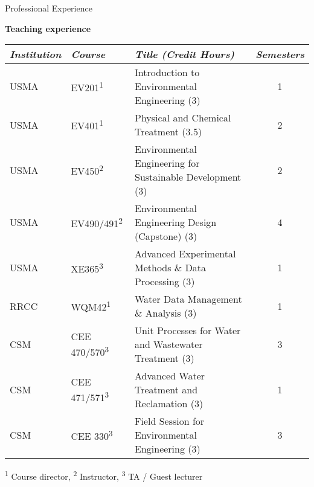 \documentclass{resume} %
\begin{document}
\begin{rSection}{Professional Experience}
\\

\begin{table}[h]
\centering
\textbf{Teaching experience}
\begin{tabular}{lllc}
\toprule
  \emph{Institution} & \emph{Course} & \emph{Title (Credit Hours)} & \emph{Semesters}\\
\midrule			
  USMA & EV201\textsuperscript{1}& Introduction to Environmental Engineering (3) & 1  \\
  USMA & EV401\textsuperscript{1} & Physical and Chemical Treatment (3.5) & 2  \\
  USMA & EV450\textsuperscript{2} & Environmental Engineering for Sustainable Development (3) & 2 \\
  USMA & EV490/491\textsuperscript{2} & Environmental Engineering Design (Capstone) (3) & 4  \\
  USMA & XE365\textsuperscript{3} & Advanced Experimental Methods \& Data Processing (3) & 1  \\
  RRCC & WQM42\textsuperscript{1} & Water Data Management \& Analysis (3) & 1 \\
  CSM & CEE 470/570\textsuperscript{3} & Unit Processes for Water and Wastewater Treatment (3) & 3 \\
  CSM & CEE 471/571\textsuperscript{3} & Advanced Water Treatment and Reclamation (3) & 1 \\
  CSM & CEE 330\textsuperscript{3} & Field Session for Environmental Engineering (3) & 3  \\
\bottomrule
\end{tabular}

\smallskip\footnotesize{\textsuperscript{1} Course director, \textsuperscript{2} Instructor, \textsuperscript{3} TA / Guest lecturer}

\end{table}

\end{rSection}

\end{document}
